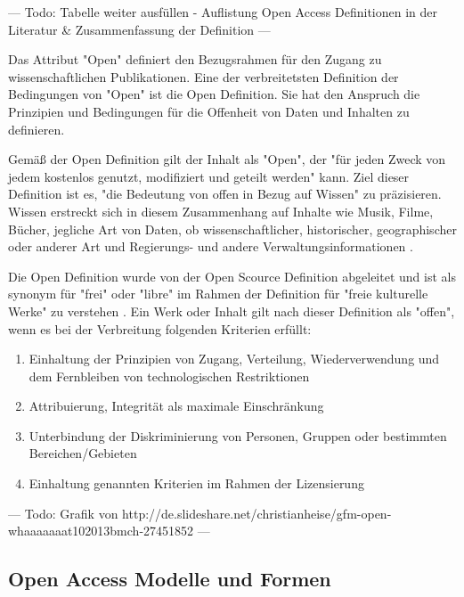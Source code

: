 --- Todo: Tabelle weiter ausfüllen - Auflistung Open Access Definitionen in der Literatur &
Zusammenfassung der Definition ---

Das Attribut "Open" definiert den Bezugsrahmen für den Zugang zu wissenschaftlichen Publikationen. Eine der verbreitetsten Definition der Bedingungen von "Open" ist die Open Definition. Sie hat den Anspruch die Prinzipien und Bedingungen für die Offenheit von Daten und Inhalten zu definieren.

Gemäß der Open Definition gilt der Inhalt als "Open", der "für jeden Zweck von jedem kostenlos genutzt, modifiziert und geteilt werden" \cite{open_definition} kann. Ziel dieser Definition ist es, "die Bedeutung von offen in Bezug auf Wissen" zu präzisieren. Wissen erstreckt sich in diesem Zusammenhang auf Inhalte wie Musik, Filme, Bücher, jegliche Art von Daten, ob wissenschaftlicher, historischer, geographischer oder anderer Art und Regierungs- und andere Verwaltungsinformationen \cite{open_definition}.

Die Open Definition wurde von der Open Scource Definition abgeleitet und ist als synonym für "frei" oder "libre" im Rahmen der Definition für "freie kulturelle Werke" zu verstehen \cite{suchen}. Ein Werk oder Inhalt gilt nach dieser Definition als "offen", wenn es bei der Verbreitung folgenden Kriterien erfüllt:
\begin{enumerate}
\item Einhaltung der Prinzipien von Zugang, Verteilung, Wiederverwendung und dem Fernbleiben von technologischen Restriktionen
\item Attribuierung, Integrität als maximale Einschränkung
\item Unterbindung der Diskriminierung von Personen, Gruppen oder bestimmten Bereichen/Gebieten
\item Einhaltung genannten Kriterien  im Rahmen der Lizensierung
\end{enumerate}

--- Todo: Grafik von http://de.slideshare.net/christianheise/gfm-open-whaaaaaaat102013bmch-27451852 ---

\subsection{Open Access Modelle und Formen}

